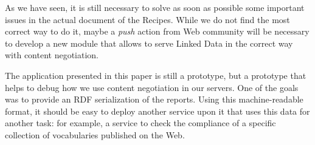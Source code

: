 \documentclass{../templates/llncs}
\begin{document}
As we have seen, it is still necessary to solve as soon as possible some 
important issues in the actual document of the Recipes. While we do not 
find the most correct way to do it, maybe a \textit{push} action from Web 
community will be necessary to develop a new module that allows to serve 
Linked Data in the correct way with content negotiation.

The application presented in this paper is still a prototype, but a prototype 
that helps to debug how we use content negotiation in our servers. One of the 
goals was to provide an RDF serialization of the reports. Using this machine-readable 
format, it should be easy to deploy another service upon it that uses this data for 
another task: for example, a service to check the compliance of a specific collection 
of vocabularies published on the Web.




\end{document}
